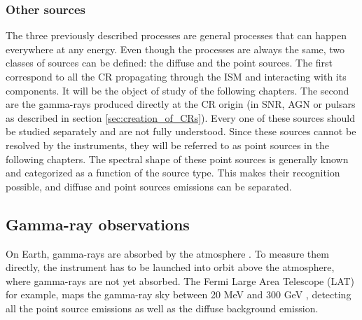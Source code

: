 \subsubsection{Other sources}

The three previously described processes are general processes that can happen everywhere at any energy. Even though the processes are always the same, two classes of sources can be defined: the diffuse and the point sources.
The first correspond to all the CR propagating through the ISM and interacting with its components. It will be the object of study of the following chapters. 
The second are the gamma-rays produced directly at the CR origin (in SNR, AGN or pulsars as described in section \ref{sec:creation_of_CRs}). Every one of these sources should be studied separately and are not fully understood. Since these sources cannot be resolved by the instruments, they will be referred to as point sources in the following chapters. The spectral shape of these point sources is generally known and categorized as a function of the source type. This makes their recognition possible, and diffuse and point sources emissions can be separated.




\subsection{Gamma-ray observations}

On Earth, gamma-rays are absorbed by the atmosphere . To measure them directly, the instrument has to be launched into orbit above the atmosphere, where gamma-rays are not yet absorbed. The Fermi Large Area Telescope (LAT) for example, maps the gamma-ray sky between 20 MeV and 300 GeV , detecting all the point source emissions as well as the diffuse background emission.


